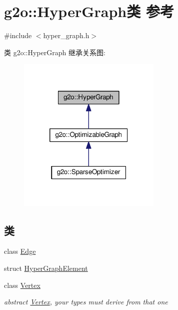 \hypertarget{classg2o_1_1HyperGraph}{\section{g2o\-:\-:Hyper\-Graph类 参考}
\label{classg2o_1_1HyperGraph}
}


{\ttfamily \#include $<$hyper\-\_\-graph.\-h$>$}



类 g2o\-:\-:Hyper\-Graph 继承关系图\-:
\nopagebreak
\begin{figure}[H]
\begin{center}
\leavevmode
\includegraphics[width=194pt]{classg2o_1_1HyperGraph__inherit__graph}
\end{center}
\end{figure}
\subsection*{类}
\begin{DoxyCompactItemize}
\item 
class \hyperlink{classg2o_1_1HyperGraph_1_1Edge}{Edge}
\item 
struct \hyperlink{structg2o_1_1HyperGraph_1_1HyperGraphElement}{Hyper\-Graph\-Element}
\item 
class \hyperlink{classg2o_1_1HyperGraph_1_1Vertex}{Vertex}
\begin{DoxyCompactList}\small\item\em abstract \hyperlink{classg2o_1_1HyperGraph_1_1Vertex}{Vertex}, your types must derive from that one \end{DoxyCompactList}\end{DoxyCompactItemize}
